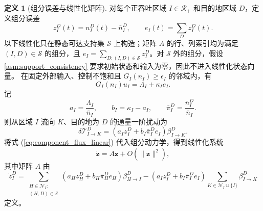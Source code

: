 \documentclass[a4paper,12pt]{article}
\theoremstyle{plain}
\theoremstyle{definition}
\newtheorem{definition}[theorem]{定义}
\theoremstyle{remark}
\begin{document}
\begin{definition}[组分误差与线性化矩阵]\label{def:component_jacobian}
对每个正吞吐区域 $I\in\mathcal R_+$ 和目的地区域 $D$，定义组分误差
\begin{equation}
    z_I^D(t)=n_I^D(t)-\bar n_I^D,\qquad e_I(t)=\sum_D z_I^D(t).
\end{equation}
以下线性化只在静态可达支持集 $\mathcal S$ 上构造；矩阵 $A$ 的行、列索引均为满足 $(I,D)\in\mathcal S$ 的组分，且 $e_I=\sum_{D:(I,D)\in\mathcal S}z_I^D$。对 $\mathcal S$ 外的组分，假设 \ref{asm:support_consistency} 要求初始状态和输入为零，因此不进入线性化状态向量。
在固定外部输入、控制不饱和且 $G_I(n_I)\ge\epsilon_I$ 的邻域内，有
\begin{equation}
    G_I(n_I)u_I=\Lambda_I+\kappa_I e_I .
\end{equation}
记
\begin{equation}
    a_I=\frac{\Lambda_I}{\bar n_I},\qquad b_I=\kappa_I-a_I,\qquad
    \bar\pi_I^D=\frac{\bar n_I^D}{\bar n_I}.
\end{equation}
则从区域 $I$ 流向 $K$、目的地为 $D$ 的通量一阶扰动为
\begin{equation}\label{eq:component_flux_linear}
    \delta \mathcal T_{I\to K}^D
    =
    \left(a_I z_I^D+b_I\bar\pi_I^D e_I\right)\beta_{I\to K}^D .
\end{equation}
将式 (\ref{eq:component_flux_linear}) 代入组分动力学，得到线性化系统
\begin{equation}\label{eq:component_linear_system}
    \dot{\bm z}=A\bm z+O(\|\bm z\|^2),
\end{equation}
其中矩阵 $A$ 由
\begin{equation}\label{eq:component_jacobian}
    \dot z_I^D
    =
    \sum_{\substack{H\in\mathcal N_I:\\(H,D)\in\mathcal S}}
    \left(a_H z_H^D+b_H\bar\pi_H^D e_H\right)\beta_{H\to I}^D
    -
    \left(a_I z_I^D+b_I\bar\pi_I^D e_I\right)
    \sum_{K\in\mathcal N_I\cup\{I\}}\beta_{I\to K}^D
\end{equation}
定义。
\end{definition}
\end{document}
